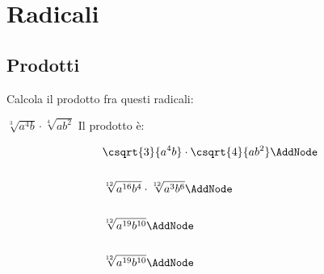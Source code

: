 \chapter{Radicali}
\section{Prodotti}
Calcola il prodotto fra questi radicali:
\tcbstartrecording
\begin{exercise}
$\sqrt[3]{a^4b}\cdot\sqrt[4]{ab^2}$
	\tcblower
	Il prodotto è:
\begin{NodesList}
	\begin{align*}
		&\csqrt{3}{a^4b}\cdot\csqrt{4}{ab^2}\AddNode\\ &\\
		&\sqrt[12]{a^{16}b^4}\cdot\sqrt[12]{a^3b^6}\AddNode\\ &\\
		&\sqrt[12]{a^{19}b^{10}}\AddNode\\ &\\
		&\sqrt[12]{a^{19}b^{10}}\AddNode\\ &\\
	\end{align*}
			
						\end{NodesList}
\end{exercise}
